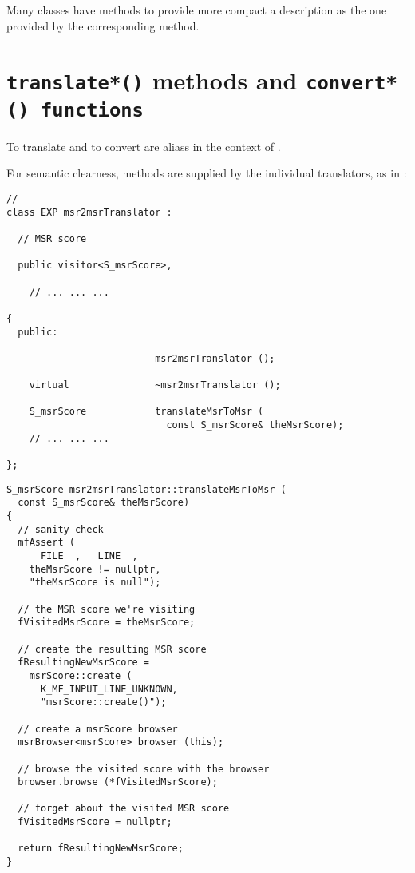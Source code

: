 Many classes have  methods to provide more compact a description as the one provided by the corresponding  method.%


\section{{\tt translate*()} methods and {\tt convert*() functions}}

To translate and to convert are aliass in the context of \mf.

For semantic clearness,  methods are supplied by the individual translators, as in :
\begin{lstlisting}[language=CPlusPlus]
//________________________________________________________________________
class EXP msr2msrTranslator :

  // MSR score

  public visitor<S_msrScore>,

	// ... ... ...

{
  public:

                          msr2msrTranslator ();

    virtual               ~msr2msrTranslator ();

    S_msrScore            translateMsrToMsr (
                            const S_msrScore& theMsrScore);
	// ... ... ...

};
\end{lstlisting}

\begin{lstlisting}[language=CPlusPlus]
S_msrScore msr2msrTranslator::translateMsrToMsr (
  const S_msrScore& theMsrScore)
{
  // sanity check
  mfAssert (
    __FILE__, __LINE__,
    theMsrScore != nullptr,
    "theMsrScore is null");

  // the MSR score we're visiting
  fVisitedMsrScore = theMsrScore;

  // create the resulting MSR score
  fResultingNewMsrScore =
    msrScore::create (
      K_MF_INPUT_LINE_UNKNOWN,
      "msrScore::create()");

  // create a msrScore browser
  msrBrowser<msrScore> browser (this);

  // browse the visited score with the browser
  browser.browse (*fVisitedMsrScore);

  // forget about the visited MSR score
  fVisitedMsrScore = nullptr;

  return fResultingNewMsrScore;
}
\end{lstlisting}

